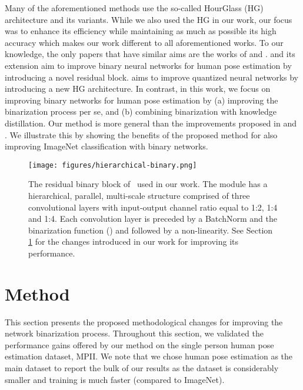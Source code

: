 \documentclass[10pt,twocolumn,letterpaper]{article}
\begin{document}
Many of the aforementioned methods use the so-called HourGlass (HG) architecture \cite{newell2016stacked} and its variants. 
While we also used the HG in our work, our focus was to enhance its efficiency while maintaining as much as possible its high accuracy which makes our work different to all aforementioned works. To our knowledge, the only papers that have similar aims are the works of \cite{bulat2017binarized}  and \cite{tang2018quantized}.
\cite{bulat2017binarized} and its extension \cite{bulat2018hierarchical} aim to improve binary neural networks for human pose estimation by introducing a novel residual block. \cite{tang2018quantized} aims to improve quantized neural networks by introducing a new HG architecture. In contrast, in this work, we focus on improving binary networks for human pose estimation by (a) improving the binarization process per se, and (b) combining binarization with knowledge distillation. Our method is more general than the improvements proposed in \cite{bulat2017binarized} and \cite{tang2018quantized}. We illustrate this by showing the benefits of the proposed method for also improving ImageNet classification with binary networks.


\begin{figure}[!htbp]


    \centering
    \texttt{[image: figures/hierarchical-binary.png]}
    \caption{The residual binary block of~\cite{bulat2018hierarchical} used in our work. The module has a hierarchical, parallel, multi-scale structure comprised of three  convolutional layers with input-output channel ratio equal to 1:2, 1:4 and 1:4. Each convolution layer is preceded by a BatchNorm and the binarization function () and followed by a non-linearity. See Section \ref{sec:binarization} for the changes introduced in our work for improving its performance.} \label{fig:multi-scale-block}

\end{figure}

\section{Method}\label{sec:binarization}

This section presents the proposed methodological changes for improving the network binarization process. Throughout this section, we validated the performance gains offered by our method on the single person human pose estimation dataset, MPII. We note that we chose human pose estimation as the main dataset to report the bulk of our results as the dataset is considerably smaller and training is much faster (compared to ImageNet).  
 
\end{document}
